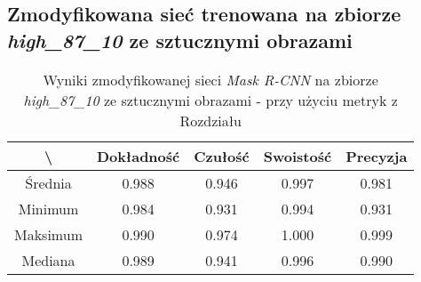 \subsection{Zmodyfikowana sieć trenowana na zbiorze \textit{high\_87\_10} ze sztucznymi obrazami}
\label{sec:results_high_modified_generated}

\begin{table}[H]
	\centering
	\caption{Wyniki zmodyfikowanej sieci \textit{Mask R-CNN} na zbiorze \textit{high\_87\_10} ze sztucznymi obrazami - przy użyciu metryk z Rozdziału }
	\vspace{6pt}
	{\footnotesize
		\begin{tabular}{|c|c|c|c|c|}
      \hline \textbackslash & Dokładność & Czułość & Swoistość & Precyzja \\
      \hline Średnia & 0.988 & 0.946 & 0.997 & 0.981 \\
      \hline Minimum & 0.984 & 0.931 & 0.994 & 0.931 \\
      \hline Maksimum & 0.990 & 0.974 & 1.000 & 0.999 \\
      \hline Mediana & 0.989 & 0.941 & 0.996 & 0.990 \\
      \hline
		\end{tabular}
	}
  \vspace{0pt}
  \label{Tab:high_modified_generated_calculated}
\end{table}

